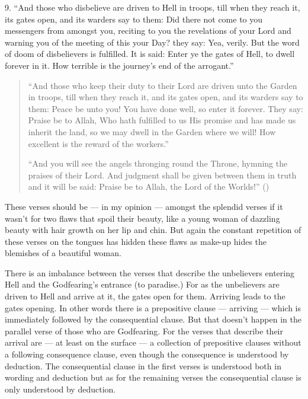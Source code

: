 \documentclass[12pt]{memoir}
\begin{document}
9. “And those who disbelieve are driven to Hell in troops,
till when they reach it, its gates open, and its warders say to them:
Did there not come to you messengers from amongst you,
reciting to you the revelations of your Lord and warning you of the meeting
of this your Day? they say: Yea, verily.
But the word of doom of disbelievers is fulfilled.
It is said: Enter ye the gates of Hell, to dwell forever in it.
How terrible is the journey’s end of the arrogant.”

\begin{quote}
“And those who keep their duty to their Lord are driven
unto the Garden in troops, till when they reach it,
and its gates open, and its warders say to them:
Peace be unto you! You have done well, so enter it forever.
They say: Praise be to Allah, Who hath fulfilled to us His promise
and has made us inherit the land, so we may dwell in the Garden where we will!
How excellent is the reward of the workers.”

“And you will see the angels thronging round the Throne,
hymning the praises of their Lord.
And judgment shall be given between them in truth and it will be said:
Praise be to Allah, the Lord of the Worlds!”
()
\end{quote}

These verses should be — in my opinion — amongst the splendid verses
if it wasn’t for two flaws that spoil their beauty,
like a young woman of dazzling beauty with hair growth on her lip and chin.
But again the constant repetition of these verses on the tongues
has hidden these flaws as make-up hides the blemishes of a beautiful woman.

There is an imbalance between the verses that describe the unbelievers
entering Hell and the God\–fearing’s entrance (to paradise.)
For as the unbelievers are driven to Hell and arrive at it,
the gates open for them. Arriving leads to the gates opening.
In other words there is a prepositive clause — arriving —
which is immediately followed by the consequential clause.
But that doesn’t happen in the parallel verse of those who are God\–fearing.
For the verses that describe their arrival are — at least on the surface —
a collection of prepositive clauses without a following consequence clause,
even though the consequence is understood by deduction.
The consequential clause in the first verses is understood both in wording
and deduction but as for the remaining verses the consequential clause
is only understood by deduction.
\end{document}
